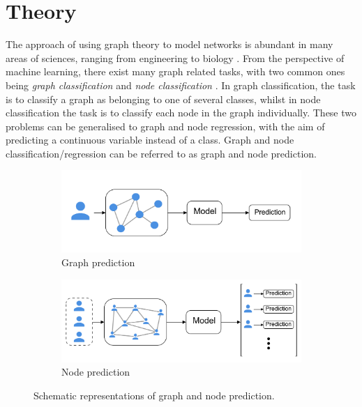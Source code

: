 \chapter{Theory}
\label{chap:theory}

The approach of using graph theory to model networks is abundant in many areas of sciences, ranging from engineering to biology \cite{network_science_chap1}. From the perspective of machine learning, there exist many graph related tasks, with two common ones being \textit{graph classification} and \textit{node classification} \cite{quadratic_graph_classification, active_learning_node_classification}. In graph classification, the task is to classify a graph as belonging to one of several classes, whilst in node classification the task is to classify each node in the graph individually. These two problems can be generalised to graph and node regression, with the aim of predicting a continuous variable instead of a class. Graph and node classification/regression can be referred to as graph and node prediction. 
%         

\begin{figure}[!htbp]
    \centering
        \begin{subfigure}{.5\textwidth}
            \centering
            \includegraphics[width=0.95\linewidth]{chapters/images_theory/graph_classification_v2.png}
            \caption{Graph prediction}
            \label{fig:subject_prediction}
        \end{subfigure}%
        \begin{subfigure}{.5\textwidth}
            \centering
            \includegraphics[width=0.95\linewidth]{chapters/images_theory/population_node_classification.png}
            \caption{Node prediction}
            \label{fig:population_prediction}
        \end{subfigure}
    \caption{Schematic representations of graph and node prediction.}
    \label{fig:graph_and_node_class}
\end{figure}

